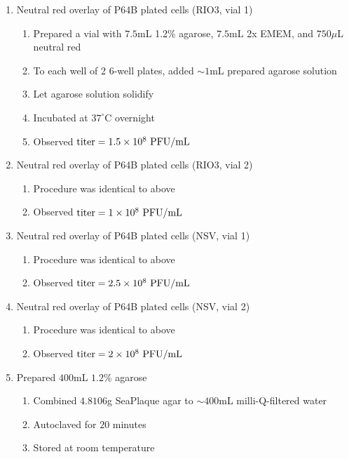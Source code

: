 \begin{enumerate}
	\item Neutral red overlay of P64B plated cells (RIO3, vial 1)
		\begin{enumerate}
			\item Prepared a vial with $7.5$mL 1.2\% agarose, $7.5$mL 2x EMEM, and $750\mu$L neutral red
			\item To each well of 2 6-well plates, added $\sim 1$mL prepared agarose solution
			\item Let agarose solution solidify
			\item Incubated at $37^{\circ}$C overnight
			\item Observed $\text{titer}=1.5\times 10^{8}\text{ PFU/mL}$
		\end{enumerate}
	\item Neutral red overlay of P64B plated cells (RIO3, vial 2)
		\begin{enumerate}
			\item Procedure was identical to above
			\item Observed $\text{titer}=1\times 10^{8}\text{ PFU/mL}$
		\end{enumerate}
	\item Neutral red overlay of P64B plated cells (NSV, vial 1)
		\begin{enumerate}
			\item Procedure was identical to above
			\item Observed $\text{titer}=2.5\times 10^{8}\text{ PFU/mL}$
		\end{enumerate}
	\item Neutral red overlay of P64B plated cells (NSV, vial 2)
		\begin{enumerate}
			\item Procedure was identical to above
			\item Observed $\text{titer}=2\times 10^{8}\text{ PFU/mL}$
		\end{enumerate}
	\item Prepared $400$mL $1.2$\% agarose
		\begin{enumerate}
			\item Combined $4.8106$g SeaPlaque agar to $\sim 400$mL milli-Q-filtered water
			\item Autoclaved for $20$ minutes
			\item Stored at room temperature
		\end{enumerate}
\end{enumerate}



